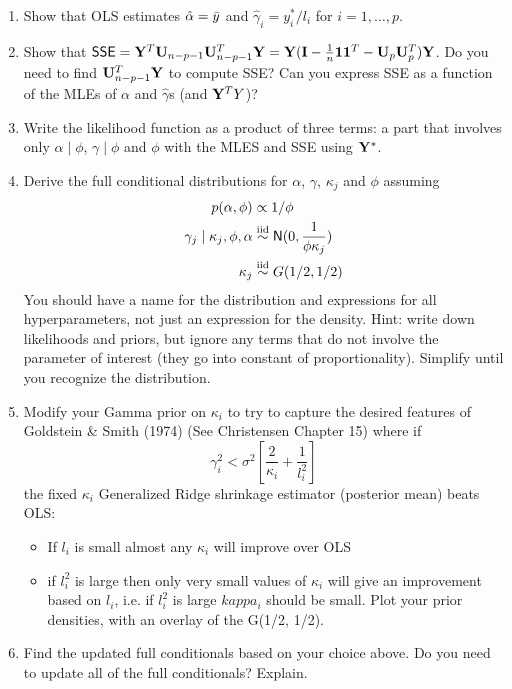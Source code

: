 \documentclass{article}
\begin{document}
\begin{enumerate}
\item Show that OLS estimates $\hat{\alpha} = \bar{y}$ and
  $\hat{\gamma}_i = y_i^*/l_i$ for $i = 1, \ldots, p$.

\item Show that $\textsf{SSE} = \mathbf{Y}^T\mathbf{U}_{n-p-1}\mathbf{U}_{n-p-1}^T \mathbf{Y} = \mathbf{Y}(\mathbf{I} -
  \frac{1}{n}\mathbf{1} \mathbf{1}^T - \mathbf{U}_p \mathbf{U}_p^T)\mathbf{Y}$.  Do you need to find
  $\mathbf{U}_{n-p-1}^T\mathbf{Y}$ to compute SSE?  Can you express SSE as a function of
  the MLEs of  $\alpha$ and $\hat{\gamma}$s (and $\mathbf{Y}^TY$)?
\item Write the  likelihood function as a product of three terms:
a part that involves only $\alpha \mid \phi$, $\gamma \mid \phi$ and
$\phi$ with the MLES and SSE using $\mathbf{Y}^*$. 

\item Derive  the
  full conditional distributions  for  $\alpha$,   $\gamma$, $\kappa_j$
  and $\phi$ assuming 
  \begin{align}
    p(\alpha, \phi) & \propto 1/\phi \\
    \gamma_j \mid \kappa_j, \phi, \alpha & \mathrel{\mathop{\sim}\limits^{\rm iid}} \textsf{N}(0, \frac{1}{\phi
                                           \kappa_j}) \\
   \kappa_j & \mathrel{\mathop{\sim}\limits^{\rm iid}} G(1/2, 1/2)
  \end{align}
You should have a name for the distribution and  
  expressions for all hyperparameters, not just an expression for the
  density. Hint: write down likelihoods and priors,
  but ignore any terms that do not involve the parameter of interest
  (they go into constant of proportionality).  Simplify until you
  recognize the distribution. 

\item Modify your Gamma prior on $\kappa_i$ to try to capture the
  desired features of Goldstein \& Smith (1974)  (See Christensen
  Chapter 15) where if
$$
\gamma_i^2 < \sigma^2\left[ \frac{2}{\kappa_i} + \frac{1}{l_i^2}  \right]
$$ the fixed $\kappa_i$ Generalized Ridge shrinkage estimator (posterior mean) beats OLS:
\begin{itemize}
\item 
If $l_i$ is small almost any $\kappa_i$ will improve over OLS 
\item 
if $l_i^2$ is large then only very small values of $\kappa_i$ will give an
improvement
based on $l_i$, i.e. if $l_i^2$ is large $kappa_i$ should be small.
Plot your prior densities, with an overlay of the G(1/2, 1/2).
\end{itemize}
\item Find the updated full conditionals based on your choice above.
  Do you need to update all of the full conditionals?  Explain.


\end{enumerate}
\end{document}
